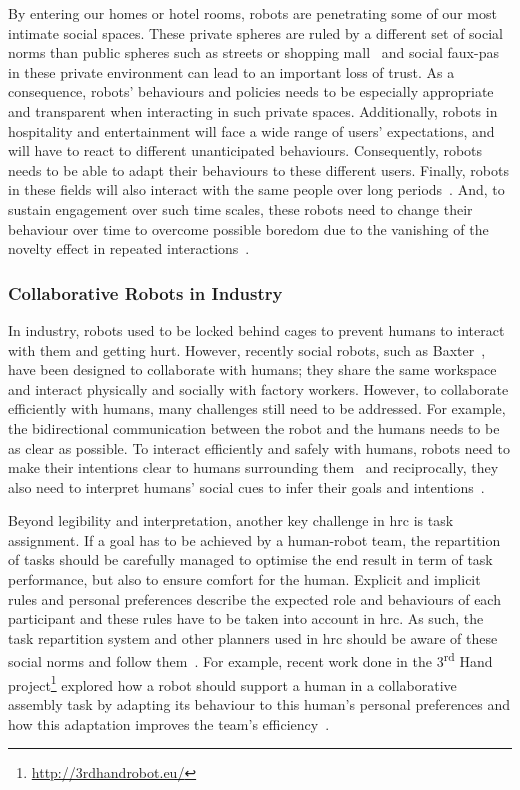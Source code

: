 By entering our homes or hotel rooms, robots are penetrating some of our most intimate social spaces. These private spheres are ruled by a different set of social norms than public spheres such as streets or shopping mall~\citep{weintraub1997theory} and social faux-pas in these private environment can lead to an important loss of trust. As a consequence, robots' behaviours and policies needs to be especially appropriate and transparent when interacting in such private spaces. Additionally, robots in hospitality and entertainment will face a wide range of users' expectations, and will have to react to different unanticipated behaviours. Consequently, robots needs to be able to adapt their behaviours to these different users. Finally, robots in these fields will also interact with the same people over long periods~\citep{leite2013social}. And, to sustain engagement over such time scales, these robots need to change their behaviour over time to overcome possible boredom due to the vanishing of the novelty effect in repeated interactions~\citep{salter2004robots}.

\subsubsection{Collaborative Robots in Industry}

In industry, robots used to be locked behind cages to prevent humans to interact with them and getting hurt. However, recently social robots, such as Baxter~\citep{guizzo2012rethink}, have been designed to collaborate with humans; they share the same workspace and interact physically and socially with factory workers. 
However, to collaborate efficiently with humans, many challenges still need to be addressed. For example, the bidirectional communication between the robot and the humans needs to be as clear as possible. To interact efficiently and safely with humans, robots need to make their intentions clear to humans surrounding them~\citep{dragan2013legibility} and reciprocally, they also need to interpret humans' social cues to infer their goals and intentions~\citep{scheutz2007first}.

Beyond legibility and interpretation, another key challenge in \gls{hrc} is task assignment. If a goal has to be achieved by a human-robot team, the repartition of tasks should be carefully managed to  optimise the end result in term of task performance, but also to ensure comfort for the human. Explicit and implicit rules and personal preferences describe the expected role and behaviours of each participant and these rules have to be taken into account in \gls{hrc}. As such, the task repartition system and other planners used in \gls{hrc} should be aware of these social norms and follow them~\citep{montreuil2007planning}. For example, recent work done in the 3\textsuperscript{rd} Hand project\footnote{\url{http://3rdhandrobot.eu/}} explored how a robot should support a human in a collaborative assembly task by adapting its behaviour to this human's personal preferences and how this adaptation improves the team's efficiency~\citep{munzer2017efficient}.

